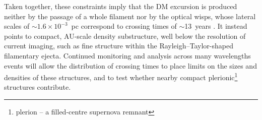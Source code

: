 Taken together, these constraints imply that the DM excursion is produced neither by the passage of a whole filament nor by the optical wisps, whose lateral scales of $\sim$$1.6\times10^{-3}$~pc correspond to crossing times of $\sim$13~years \citep{mckee_temporal_2018}. It instead points to compact, AU-scale density substructure, well below the resolution of current imaging, such as fine structure within the Rayleigh--Taylor-shaped filamentary ejecta. Continued monitoring and analysis across many wavelengths events will allow the distribution of crossing times to place limits on the sizes and densities of these structures, and to test whether nearby compact plerionic\footnote{plerion -- a filled-centre supernova remnant} structures contribute.






